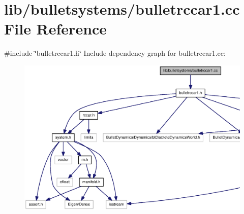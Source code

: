 \section{lib/bulletsystems/bulletrccar1.cc \-File \-Reference}
\label{bulletrccar1_8cc}
{\ttfamily \#include \char`\"{}bulletrccar1.\-h\char`\"{}}\*
\-Include dependency graph for bulletrccar1.\-cc\-:\nopagebreak
\begin{figure}[H]
\begin{center}
\leavevmode
\includegraphics[width=350pt]{bulletrccar1_8cc__incl}
\end{center}
\end{figure}
